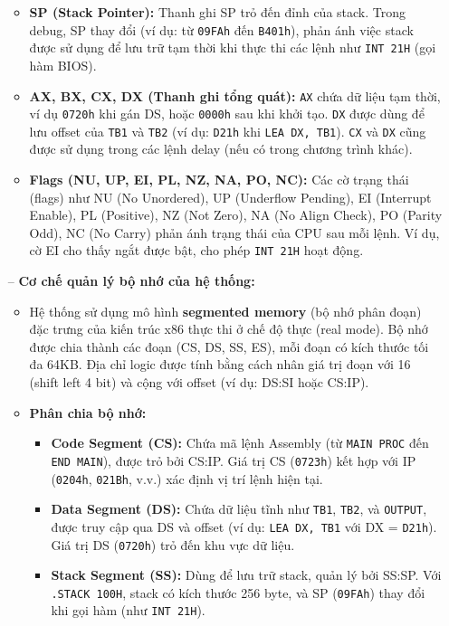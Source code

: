 \documentclass{article}
\begin{document}
\begin{itemize}
\begin{itemize}[label=$+$]
        \item \textbf{SP (Stack Pointer):} Thanh ghi SP trỏ đến đỉnh của stack. Trong debug, SP thay đổi (ví dụ: từ \texttt{09FAh} đến \texttt{B401h}), phản ánh việc stack được sử dụng để lưu trữ tạm thời khi thực thi các lệnh như \texttt{INT 21H} (gọi hàm BIOS).

        \item \textbf{AX, BX, CX, DX (Thanh ghi tổng quát):} \texttt{AX} chứa dữ liệu tạm thời, ví dụ \texttt{0720h} khi gán DS, hoặc \texttt{0000h} sau khi khởi tạo. \texttt{DX} được dùng để lưu offset của \texttt{TB1} và \texttt{TB2} (ví dụ: \texttt{D21h} khi \texttt{LEA DX, TB1}). \texttt{CX} và \texttt{DX} cũng được sử dụng trong các lệnh delay (nếu có trong chương trình khác).

        \item \textbf{Flags (NU, UP, EI, PL, NZ, NA, PO, NC):} Các cờ trạng thái (flags) như NU (No Unordered), UP (Underflow Pending), EI (Interrupt Enable), PL (Positive), NZ (Not Zero), NA (No Align Check), PO (Parity Odd), NC (No Carry) phản ánh trạng thái của CPU sau mỗi lệnh. Ví dụ, cờ EI cho thấy ngắt được bật, cho phép \texttt{INT 21H} hoạt động.
    \end{itemize}
    
    \item[--] \textbf{Cơ chế quản lý bộ nhớ của hệ thống:}
    \begin{itemize}[label=$+$]
        \item Hệ thống sử dụng mô hình \textbf{segmented memory} (bộ nhớ phân đoạn) đặc trưng của kiến trúc x86 thực thi ở chế độ thực (real mode). Bộ nhớ được chia thành các đoạn (CS, DS, SS, ES), mỗi đoạn có kích thước tối đa 64KB. Địa chỉ logic được tính bằng cách nhân giá trị đoạn với 16 (shift left 4 bit) và cộng với offset (ví dụ: DS:SI hoặc CS:IP).

        \item \textbf{Phân chia bộ nhớ:}
        \begin{itemize}
            \item \textbf{Code Segment (CS):} Chứa mã lệnh Assembly (từ \texttt{MAIN PROC} đến \texttt{END MAIN}), được trỏ bởi CS:IP. Giá trị CS (\texttt{0723h}) kết hợp với IP (\texttt{0204h}, \texttt{021Bh}, v.v.) xác định vị trí lệnh hiện tại.
            \item \textbf{Data Segment (DS):} Chứa dữ liệu tĩnh như \texttt{TB1}, \texttt{TB2}, và \texttt{OUTPUT}, được truy cập qua DS và offset (ví dụ: \texttt{LEA DX, TB1} với DX = \texttt{D21h}). Giá trị DS (\texttt{0720h}) trỏ đến khu vực dữ liệu.
            \item \textbf{Stack Segment (SS):} Dùng để lưu trữ stack, quản lý bởi SS:SP. Với \texttt{.STACK 100H}, stack có kích thước 256 byte, và SP (\texttt{09FAh}) thay đổi khi gọi hàm (như \texttt{INT 21H}).
        \end{itemize}
    \end{itemize}
\end{itemize}
\end{document}
